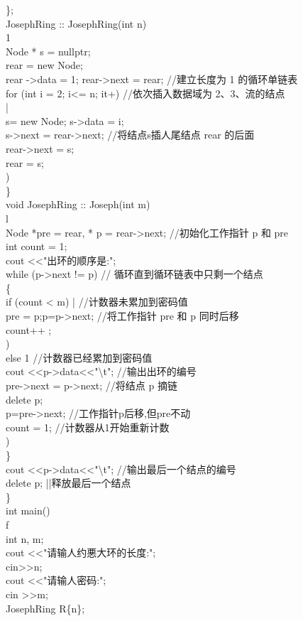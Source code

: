 \documentclass[10pt]{article}
\begin{document}
\};\\
JosephRing :: JosephRing(int n)\\
1\\
Node * s = nullptr;\\
rear = new Node;\\
rear ->data = 1; rear->next = rear; //建立长度为 1 的循环单链表\\
for (int i = 2; i<= n; it+) //依次插入数据域为 2、3、流的结点\\
|\\
s= new Node; s->data = i;\\
s->next = rear->next; //将结点s插人尾结点 rear 的后面\\
rear->next = s;\\
rear = s;\\
)\\
\}\\
void JosephRing :: Joseph(int m)\\
l\\
Node *pre = rear, * p = rear->next; //初始化工作指针 p 和 pre\\
int count = 1;\\
cout <<"出环的顺序是:";\\
while (p->next != p) // 循环直到循环链表中只剩一个结点\\
\{\\
if (count < m) | //计数器未累加到密码值\\
pre = p;p=p->next; //将工作指针 pre 和 p 同时后移\\
count++ ;\\
)\\
else 1 //计数器已经累加到密码值\\
cout <<p->data<<"\textbackslash t"; //输出出环的编号\\
pre->next = p->next; //将结点 p 摘链\\
delete p;\\
p=pre->next; //工作指针p后移,但pre不动\\
count = 1; //计数器从1开始重新计数\\
)\\
\}\\
cout <<p->data<<"\textbackslash t"; //输出最后一个结点的编号\\
delete p; ||释放最后一个结点\\
\}\\
int main()\\
f\\
int n, m;\\
cout <<"请输人约悪大环的长度:";\\
cin>>n;\\
cout <<"请输人密码:";\\
cin >>m;\\
JosephRing R\{n\};
\end{document}
